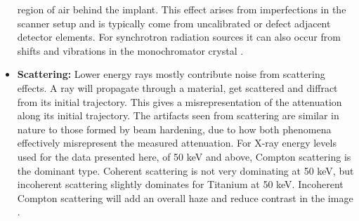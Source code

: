 \begin{itemize}
		region of air behind the implant. This effect arises from
		imperfections in the scanner setup and is typically come from
		uncalibrated or defect adjacent detector elements. For
		synchrotron radiation sources it can also occur from shifts and
		vibrations in the monochromator crystal \cite{ringartefacts}.
	\item \textbf{Scattering:} Lower energy rays mostly contribute noise
		from scattering effects. A ray will propagate through a
		material, get scattered and diffract from its initial
		trajectory. This gives a misrepresentation of the attenuation
		along its initial trajectory. The artifacts seen from
		scattering are similar in nature to those formed by beam
		hardening, due to how both phenomena effectively misrepresent
		the measured attenuation.  For X-ray energy levels used for the
		data presented here, of 50 keV and above, Compton scattering is
		the dominant type.  Coherent scattering is not very dominating
		at 50 keV, but incoherent scattering slightly dominates for
		Titanium at 50 keV. Incoherent Compton scattering will add an
		overall haze and reduce contrast in the image
		\cite{Compton}\cite{xray-attenuation-10-kev-100-mev}\cite{attenuation-cross-sections}.
\end{itemize}

